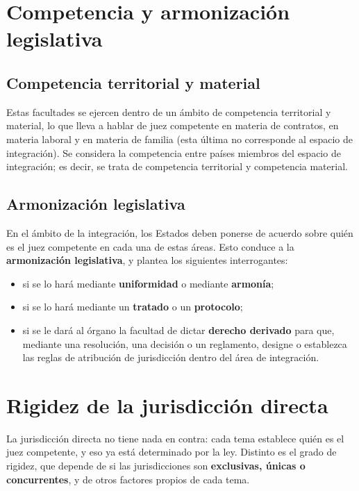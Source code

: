 \documentclass[12pt,oneside]{book}
\begin{document}
\section{Competencia y armonización legislativa}

\subsection{Competencia territorial y material}

Estas facultades se ejercen dentro de un ámbito de competencia territorial y material, lo que lleva a hablar de juez competente en materia de contratos, en materia laboral y en materia de familia (esta última no corresponde al espacio de integración). Se considera la competencia entre países miembros del espacio de integración; es decir, se trata de competencia territorial y competencia material.

\subsection{Armonización legislativa}

En el ámbito de la integración, los Estados deben ponerse de acuerdo sobre quién es el juez competente en cada una de estas áreas. Esto conduce a la \textbf{armonización legislativa}, y plantea los siguientes interrogantes:

\begin{itemize}
    \item si se lo hará mediante \textbf{uniformidad} o mediante \textbf{armonía};
    \item si se lo hará mediante un \textbf{tratado} o un \textbf{protocolo};
    \item si se le dará al órgano la facultad de dictar \textbf{derecho derivado} para que, mediante una resolución, una decisión o un reglamento, designe o establezca las reglas de atribución de jurisdicción dentro del área de integración.
\end{itemize}

\section{Rigidez de la jurisdicción directa}

La jurisdicción directa no tiene nada en contra: cada tema establece quién es el juez competente, y eso ya está determinado por la ley. Distinto es el grado de rigidez, que depende de si las jurisdicciones son \textbf{exclusivas, únicas o concurrentes}, y de otros factores propios de cada tema.
\end{document}
